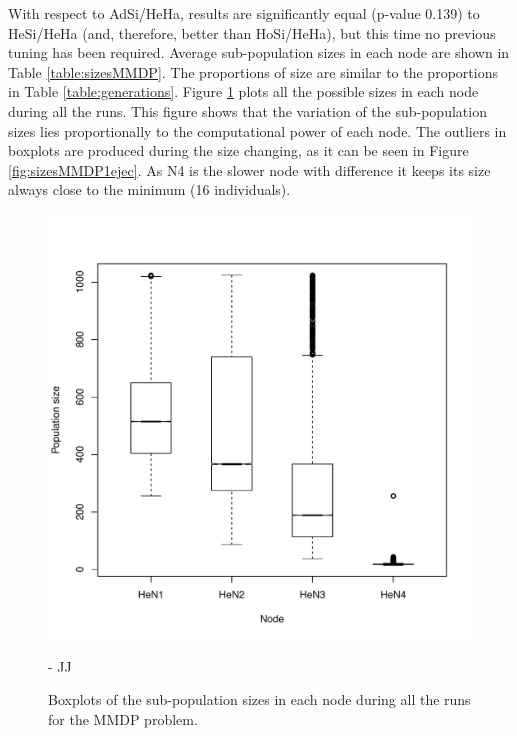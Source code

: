 With respect to AdSi/HeHa, %
results are significantly  equal (p-value 0.139) to HeSi/HeHa (and,
therefore, better than HoSi/HeHa), but this time no previous tuning
has been required.  Average sub-population sizes in each node are
shown in Table \ref{table:sizesMMDP}. The proportions of size are
similar to the proportions in Table \ref{table:generations}. Figure
\ref{fig:sizesMMDP} plots all the possible sizes in each node during
all the runs. This figure shows that the variation of the
sub-population sizes lies proportionally to the computational power of
each node. The outliers in boxplots are produced during the size
changing, as it can be seen in Figure \ref{fig:sizesMMDP1ejec}. As N4
is the slower node with difference it keeps its size always close to
the minimum (16 individuals). %

\begin{figure}
\centering
 \includegraphics[scale =0.4] {gfx/adaptiveresults/sizesMMDP.pdf}
\caption{Boxplots of the sub-population sizes in each node during all
  the runs for the MMDP problem.} 
- JJ
\label{fig:sizesMMDP}
\end{figure}

